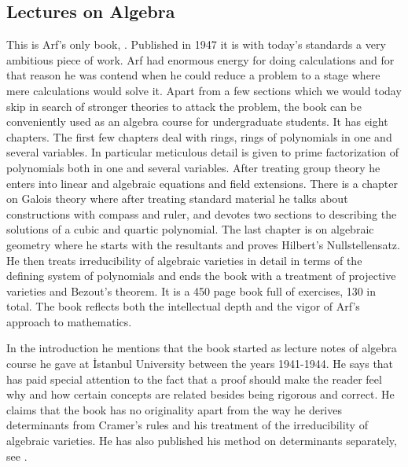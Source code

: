 \documentclass[12pt]{amsart}
\begin{document}
\subsection{Lectures on Algebra}
This is Arf's only book, \cite{arfkitap}. Published in 1947 it is with today's standards a very ambitious piece of work.  Arf had  enormous energy for doing calculations and for that reason he was contend when he could reduce a problem to a stage where mere calculations would solve it. Apart from a few sections which  we would today skip in search of stronger theories to attack the problem, the book can be conveniently used  as an algebra course for undergraduate students. It has eight chapters. The first few chapters deal with rings, rings of polynomials in one and several variables. In particular meticulous detail is given to prime factorization of polynomials both in one and several variables. After treating group theory he enters into linear and algebraic equations and field extensions. There is a chapter on Galois theory where after treating standard material he talks about constructions with compass and ruler, and devotes two sections to describing the solutions of a cubic and quartic polynomial. The last chapter is on algebraic geometry where he starts with the resultants and proves Hilbert's Nullstellensatz. He then treats irreducibility of algebraic varieties in detail in terms of the defining system of polynomials and ends the book with a treatment of projective varieties and Bezout's theorem. It is a 450 page book full of exercises, 130 in total. The book reflects both the intellectual depth and the vigor of Arf's approach to mathematics.

In the introduction he mentions that the book started as lecture notes of algebra course he gave at {\.I}stanbul University between the years 1941-1944. He says that has paid special attention to the fact that a proof should make the reader feel why and how certain concepts are related besides being rigorous and correct. He claims that the book has no originality apart from the way he derives determinants from Cramer's rules and his treatment of the irreducibility of algebraic varieties. He has also published his method on determinants separately, see \cite{carf7}.
\end{document}
